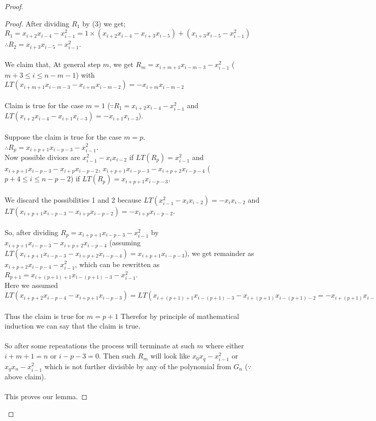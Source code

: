 \documentclass[12pt,a4paper]{article}
\theoremstyle{definition}
\begin{document}
\begin{proof}
\begin{proof}
After dividing $R_1$ by (3) we get;\\
$R_1 = x_{i+2}x_{i-4}-x_{i-1}^2 = 1\times (x_{i+2}x_{i-4}-x_{i+3}x_{i-5}) + (x_{i+3}x_{i-5}-x_{i-1}^2)$
\\
$\therefore R_2 = x_{i+3}x_{i-5}-x_{i-1}^2$.\\
\\
We claim that, 
At general step $m$, we get $R_m = x_{i+m+1}x_{i-m-3}-x_{i-1}^2$ ($m+3 \leq i \leq n-m-1$) with $LT(x_{i+m+1}x_{i-m-3}-x_{i+m}x_{i-m-2})=-x_{i+m}x_{i-m-2}$    %
\\
\\
Claim is true for the case $m=1$ ($\because R_1=x_{i+2}x_{i-4}-x_{i-1}^2$ and $LT(x_{i+2}x_{i-4}-x_{i+1}x_{i-3}) = -x_{i+1}x_{i-3}$).
\\
\\
Suppose the claim is true for the case $m=p$.\\
$\therefore R_p = x_{i+p+1}x_{i-p-3}-x_{i-1}^2$.\\
Now possible diviors are $x_{i-1}^2-x_{i}x_{i-2}$ if $LT(R_p)= x_{i-1}^2$ and $ x_{i+p+1}x_{i-p-3}- x_{i+p}x_{i-p-2}$, $x_{i+p+1}x_{i-p-3}-x_{i+p+2}x_{i-p-4}$ ($p+4 \leq i \leq n-p-2$) if $LT(R_p) = x_{i+p+1}x_{i-p-3}$.\\
\\
We discard the possibilities 1 and 2 because $LT(x_{i-1}^2-x_{i}x_{i-2}) = -x_{i}x_{i-2}$ and $LT( x_{i+p+1}x_{i-p-3}- x_{i+p}x_{i-p-2}) = - x_{i+p}x_{i-p-2}$.\\
\\
So, after dividing $R_p = x_{i+p+1}x_{i-p-3}-x_{i-1}^2$ by $x_{i+p+1}x_{i-p-3}-x_{i+p+2}x_{i-p-4}$ (assuming $LT(x_{i+p+1}x_{i-p-3}-x_{i+p+2}x_{i-p-4}) = x_{i+p+1}x_{i-p-3}$), we get remainder as $x_{i+p+2}x_{i-p-4}-x_{i-1}^2$, which can be rewritten as $R_{p+1} = x_{i+(p+1)+1}x_{i-(p+1)-3}-x_{i-1}^2$.\\ Here we assumed $LT(x_{i+p+2}x_{i-p-4}-x_{i+p+1}x_{i-p-3}) = LT(x_{i+(p+1)+1}x_{i-(p+1)-3}-x_{i+(p+1)}x_{i-(p+1)-2} = -x_{i+(p+1)}x_{i-(p+1)-2})$\\
\\
Thus the claim is true for $m=p+1$ Therefor by principle of mathematical induction we can say that the claim is true.\\
\\
So after some repeatations the process will terminate at such $m$ where either $i+m+1 = n$ or $i-p-3 = 0$. Then such $R_m$ will look like $x_{0}x_{q}-x_{i-1}^2$ or $x_{q}x_{n} - x_{i-1}^2$ which is not further divisible by any of the polynomial from $G_n$ ($\because$ above claim).\\
\\ This proves our lemma.
\end{proof}


\end{proof}
\end{document}
